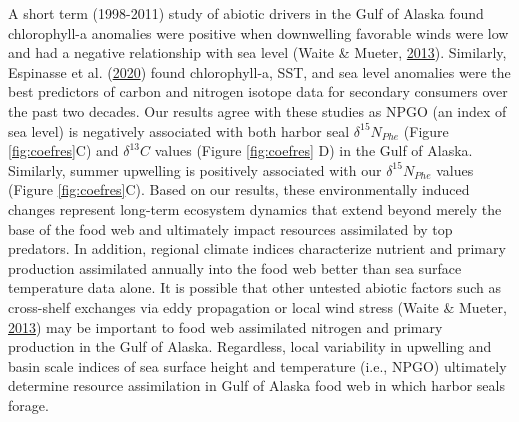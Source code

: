 \documentclass [11pt, proquest] {uwthesis}[2015/03/03]
\begin{document}
A short term (1998-2011) study of abiotic drivers in the Gulf of Alaska
found chlorophyll-a anomalies were positive when downwelling favorable
winds were low and had a negative relationship with sea level (Waite \&
Mueter, \protect\hyperlink{ref-Waite2013}{2013}). Similarly, Espinasse
et al. (\protect\hyperlink{ref-Espinasse2020}{2020}) found
chlorophyll-a, SST, and sea level anomalies were the best predictors of
carbon and nitrogen isotope data for secondary consumers over the past
two decades. Our results agree with these studies as NPGO (an index of
sea level) is negatively associated with both harbor seal
\(\delta^{15}N_{Phe}\) (Figure \ref{fig:coefres}C) and \(\delta^{13}C\)
values (Figure \ref{fig:coefres} D) in the Gulf of Alaska. Similarly,
summer upwelling is positively associated with our
\(\delta^{15}N_{Phe}\) values (Figure \ref{fig:coefres}C). Based on our
results, these environmentally induced changes represent long-term
ecosystem dynamics that extend beyond merely the base of the food web
and ultimately impact resources assimilated by top predators. In
addition, regional climate indices characterize nutrient and primary
production assimilated annually into the food web better than sea
surface temperature data alone. It is possible that other untested
abiotic factors such as cross-shelf exchanges via eddy propagation or
local wind stress (Waite \& Mueter,
\protect\hyperlink{ref-Waite2013}{2013}) may be important to food web
assimilated nitrogen and primary production in the Gulf of Alaska.
Regardless, local variability in upwelling and basin scale indices of
sea surface height and temperature (i.e., NPGO) ultimately determine
resource assimilation in Gulf of Alaska food web in which harbor seals
forage.
\end{document}
